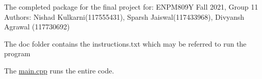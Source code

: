 The completed package for the final project for\+: E\+N\+P\+M809Y Fall 2021, Group 11 Authors\+: Nishad Kulkarni(117555431), Sparsh Jaiswal(117433968), Divyansh Agrawal (117730692)


\begin{DoxyItemize}
\item The {\ttfamily doc} folder contains the \textquotesingle{}instructions.\+txt\textquotesingle{} which may be referred to run the program
\item The \hyperlink{main_8cpp}{main.\+cpp} runs the entire code. 
\end{DoxyItemize}